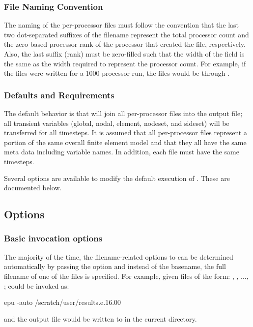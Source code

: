 \subsubsection{File Naming Convention}
The naming of the per-processor files must follow the convention that
the last two dot-separated suffixes of the filename represent the
total processor count and the zero-based processor rank of the
processor that created the file, respectively.  Also, the last suffix
(rank) must be zero-filled such that the width of the field is the
same as the width required to represent the processor count.  For
example, if the files were written for a 1000 processor run, the files
would be  through
.

\subsubsection{Defaults and Requirements}
The default behavior is that \epu{} will join all per-processor files
into the output file; all transient variables (global, nodal, element,
nodeset, and sideset) will be transferred for all timesteps.  It is
assumed that all per-processor files represent a portion of the same
overall finite element model and that they all have the same \exo{}
meta data including variable names.  In addition, each file must have
the same timesteps.

Several options are available to modify the default execution of
\epu{}. These are documented below.

\subsection{Options}

\subsubsection{Basic invocation options}
The majority of the time, the filename-related options to \epu{} can
be determined automatically by passing the  option and
instead of the basename, the full filename of one of the
files is specified. For example, given files of the form:
,
, $\ldots$,
; \epu{} could be invoked
as:
\begin{syntax}
	epu -auto /scratch/user/results.e.16.00
\end{syntax}
and the output file would be written to  in the
current directory.

